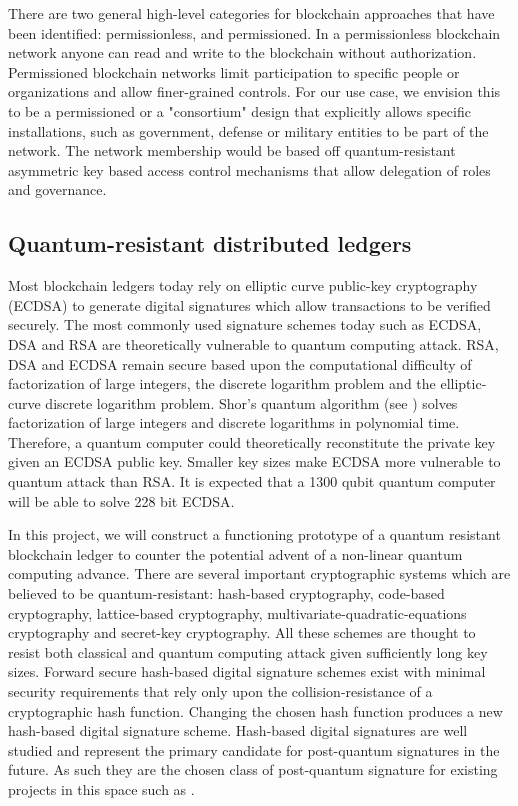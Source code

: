There are two general high-level categories for blockchain approaches that have been identified: permissionless, and
permissioned. In a permissionless blockchain network anyone can read and write to the blockchain without authorization.
Permissioned blockchain networks limit participation to specific people or organizations and allow finer-grained
controls.  For our use case, we envision this to be a permissioned or a "consortium" design that explicitly allows
specific installations, such as government, defense or military entities to be part of the network.  The network
membership would be based off quantum-resistant asymmetric key based access control mechanisms that allow
delegation of roles and governance.

\subsection{Quantum-resistant distributed ledgers}

Most blockchain ledgers today rely on elliptic curve public-key cryptography (ECDSA) to generate digital signatures
which allow transactions to be verified securely. The most commonly used signature schemes today such as ECDSA, DSA and
RSA are theoretically vulnerable to quantum computing attack. RSA, DSA and ECDSA remain secure based upon the
computational difficulty of factorization of large integers, the discrete logarithm problem and the elliptic-curve
discrete logarithm problem. Shor’s quantum algorithm (see \cite{shor1997}) solves factorization of large integers and discrete
logarithms in polynomial time. Therefore, a quantum computer could theoretically reconstitute the private key given an
ECDSA public key. Smaller key sizes make ECDSA more vulnerable to quantum attack than RSA. It is expected that a 
1300 qubit quantum computer will be able to solve 228 bit ECDSA.

In this project, we will construct a functioning prototype of a quantum resistant blockchain ledger to counter the
potential advent of a non-linear quantum computing advance.  There are several important cryptographic systems which are
believed to be quantum-resistant: hash-based cryptography, code-based cryptography, lattice-based cryptography,
multivariate-quadratic-equations cryptography and secret-key cryptography. All these schemes are thought to resist both
classical and quantum computing attack given sufficiently long key sizes.  Forward secure hash-based digital signature
schemes exist with minimal security requirements that rely only upon the collision-resistance of a cryptographic hash
function. Changing the chosen hash function produces a new hash-based digital signature scheme. Hash-based digital
signatures are well studied and represent the primary candidate for post-quantum signatures in the future. As such they
are the chosen class of post-quantum signature for existing projects in this space such as \cite{qrl2016}.


